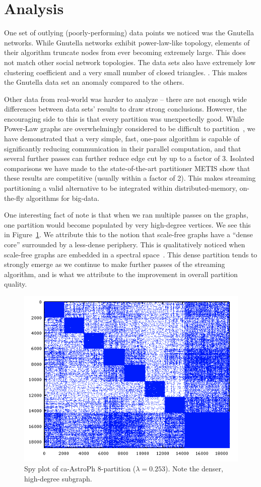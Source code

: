 \section{Analysis}

One set of outlying (poorly-performing) data points we noticed was the Gnutella networks. While Gnutella networks exhibit power-law-like topology, elements of their algorithm truncate nodes from ever becoming extremely large. This does not match other social network topologies. The data sets also have extremely low clustering coefficient and a very small number of closed triangles. \cite{Ripeanu:2002:MGN:613352.613670}. This makes the Gnutella data set an anomaly compared to the others. 

Other data from real-world was harder to analyze -- there are not enough wide differences between data sets' results to draw strong conclusions. However, the encouraging side to this is that every partition was unexpectedly good. While Power-Law graphs are overwhelmingly considered to be difficult to partition~\cite{Abou-Rjeili:2006:MAP:1898953.1899055}, we have demonstrated that a very simple, fast, one-pass algorithm is capable of significantly reducing communication in their parallel computation, and that several further passes can further reduce edge cut by up to a factor of 3. Isolated comparisons we have made to the state-of-the-art partitioner METIS show that these results are competitive (usually within a factor of 2). This makes streaming partitioning a valid alternative to be integrated within distributed-memory, on-the-fly algorithms for big-data.

One interesting fact of note is that when we ran multiple passes on the graphs, one partition would become populated by very high-degree vertices. We see this in Figure~\ref{fig:dense}. We attribute this to the notion that scale-free graphs have a ``dense core'' surrounded by a less-dense periphery. This is qualitatively noticed when scale-free graphs are embedded in a spectral space~\cite{Lang04findinggood}. This dense partition tends to strongly emerge as we continue to make further passes of the streaming algorithm, and is what we attribute to the improvement in overall partition quality.

\begin{figure}[h!]
\centering
  \includegraphics[width=0.8\columnwidth]{figures/astroPh8.png}
  \caption{Spy plot of ca-AstroPh 8-partition ($\lambda=0.253$). Note the denser, high-degree subgraph.}
  \label{fig:dense}
\end{figure}


